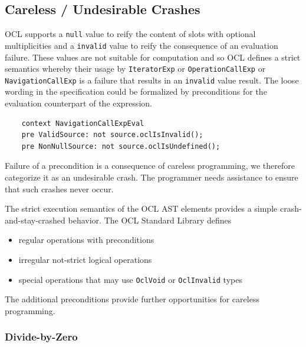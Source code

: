 \documentclass{llncs}
\begin{document}

\subsection{Careless / Undesirable Crashes}

OCL supports a \verb|null| value to reify the content of slots with optional multiplicities and a \verb|invalid| value to reify the consequence of an evaluation failure. These values are not suitable for computation and so OCL defines a strict semantics whereby their usage by \verb|IteratorExp| or \verb|OperationCallExp| or \verb|NavigationCallExp| is a failure that results in an \verb|invalid| value result.
The loose wording in the specification could be formalized by preconditions for the evaluation counterpart of the expression.

\begin{verbatim}
	context NavigationCallExpEval
	pre ValidSource: not source.oclIsInvalid();
	pre NonNullSource: not source.oclIsUndefined();
\end{verbatim}

Failure of a precondition is a consequence of careless programming, we therefore categorize it as an undesirable crash. The programmer needs assistance to ensure that such crashes never occur.

The strict execution semantics of the OCL AST elements provides a simple crash-and-stay-crashed behavior. The OCL Standard Library defines

\begin{itemize}
	\item regular operations with preconditions
	\item irregular not-strict logical operations
	\item special operations that may use \verb|OclVoid| or \verb|OclInvalid| types
\end{itemize}

The additional preconditions provide further opportunities for careless programming.


\subsubsection{Divide-by-Zero}
\end{document}
